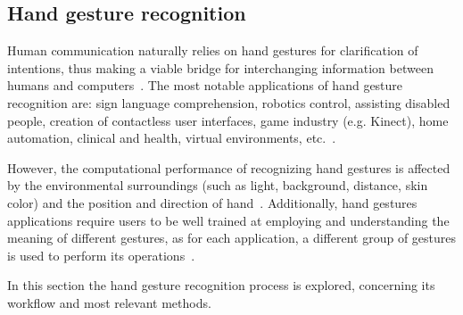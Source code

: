 \subsection{Hand gesture recognition}
\label{sec:hand-gest-recogn}
Human communication naturally relies on hand gestures for clarification of
intentions, thus making a viable bridge for interchanging information between
humans and computers~\cite{aashni2017international}.
The most notable applications of hand gesture recognition are: sign language
comprehension, robotics control, assisting disabled people, creation of
contactless user interfaces, game industry (e.g. Kinect), home automation,
clinical and health, virtual environments,
etc.~\cite{yasen2019systematic}.

However, the computational performance of recognizing hand gestures is affected
by the environmental surroundings (such as light, background, distance, skin
color) and the position and direction of
hand~\cite{vaibhavi2014review}. Additionally, hand gestures applications require
users to be well trained at employing and understanding the meaning of different
gestures, as for each application, a different group of gestures is used to
perform its operations~\cite{yasen2019systematic}.

In this section the hand gesture recognition process is explored, concerning
its workflow and most relevant methods.

